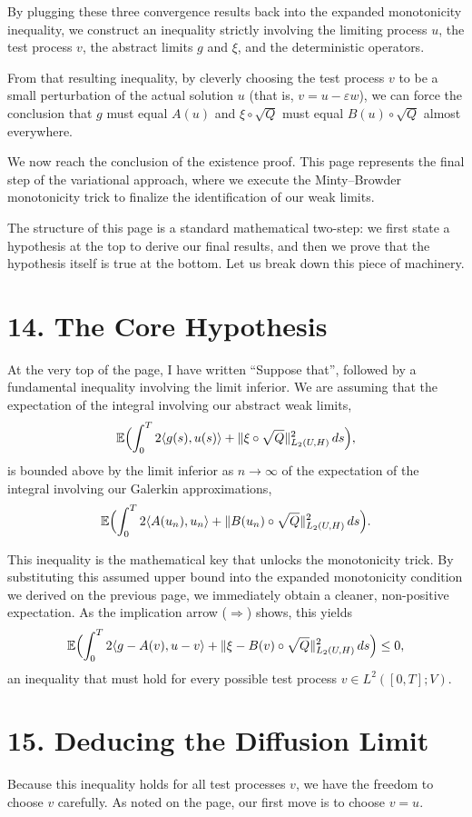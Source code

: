 \documentclass[11pt]{article}
\theoremstyle{definition}
\theoremstyle{remark}
\begin{document}
By plugging these three convergence results back into the expanded monotonicity inequality, we construct an inequality strictly involving the limiting process $u$, the test process $v$, the abstract limits $g$ and $\xi$, and the deterministic operators.

From that resulting inequality, by cleverly choosing the test process $v$ to be a small perturbation of the actual solution $u$ (that is, $v=u-\varepsilon w$), we can force the conclusion that $g$ must equal $A(u)$ and $\xi\circ \sqrt{Q}$ must equal $B(u)\circ \sqrt{Q}$ almost everywhere.


We now reach the conclusion of the existence proof. This page represents the final step of the variational approach, where we execute the Minty--Browder monotonicity trick to finalize the identification of our weak limits.

The structure of this page is a standard mathematical two-step: we first state a hypothesis at the top to derive our final results, and then we prove that the hypothesis itself is true at the bottom. Let us break down this piece of machinery.

\section*{14. The Core Hypothesis}
At the very top of the page, I have written ``Suppose that'', followed by a fundamental inequality involving the limit inferior. We are assuming that the expectation of the integral involving our abstract weak limits,
\[
  \mathbb{E}\Bigl(\int_0^T 2\langle g(s), u(s) \rangle + \|\xi \circ \sqrt{Q}\|_{L_2(U,H)}^2\,ds\Bigr),
\]
is bounded above by the limit inferior as $n\to\infty$ of the expectation of the integral involving our Galerkin approximations,
\[
  \mathbb{E}\Bigl(\int_0^T 2\langle A(u_n), u_n \rangle + \|B(u_n)\circ \sqrt{Q}\|_{L_2(U,H)}^2\,ds\Bigr).
\]

This inequality is the mathematical key that unlocks the monotonicity trick. By substituting this assumed upper bound into the expanded monotonicity condition we derived on the previous page, we immediately obtain a cleaner, non-positive expectation. As the implication arrow ($\Rightarrow$) shows, this yields
\[
  \mathbb{E}\Bigl(\int_0^T 2\langle g-A(v), u-v \rangle + \|\xi-B(v)\circ \sqrt{Q}\|_{L_2(U,H)}^2\,ds\Bigr) \le 0,
\]
an inequality that must hold for every possible test process $v\in L^2([0,T];V)$.

\section*{15. Deducing the Diffusion Limit}
Because this inequality holds for all test processes $v$, we have the freedom to choose $v$ carefully. As noted on the page, our first move is to choose $v=u$.
\end{document}
